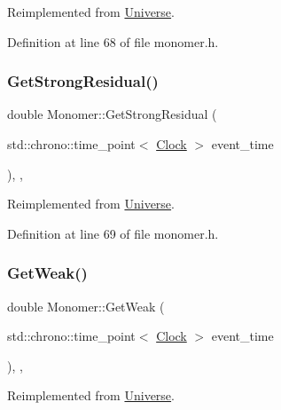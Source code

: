 Reimplemented from \hyperlink{class_universe_ab44daccba01ee7e3cf9b50bba83dd19e}{Universe}.



Definition at line 68 of file monomer.\+h.

\mbox{\label{class_monomer_a3b00168520f592098356f7cd3e663ad3}} 
\subsubsection{\texorpdfstring{Get\+Strong\+Residual()}{GetStrongResidual()}}
{\footnotesize\ttfamily double Monomer\+::\+Get\+Strong\+Residual (\begin{DoxyParamCaption}\item[{std\+::chrono\+::time\+\_\+point$<$ \hyperlink{universe_8h_a0ef8d951d1ca5ab3cfaf7ab4c7a6fd80}{Clock} $>$}]{event\+\_\+time }\end{DoxyParamCaption})\hspace{0.3cm}{\ttfamily [inline]}, {\ttfamily [final]}, {\ttfamily [virtual]}}



Reimplemented from \hyperlink{class_universe_af0f4b81950061e63c2855eb40957a5b1}{Universe}.



Definition at line 69 of file monomer.\+h.

\mbox{\label{class_monomer_ac2070d7e39cd0b2a00aa6023ffd51f55}} 
\subsubsection{\texorpdfstring{Get\+Weak()}{GetWeak()}}
{\footnotesize\ttfamily double Monomer\+::\+Get\+Weak (\begin{DoxyParamCaption}\item[{std\+::chrono\+::time\+\_\+point$<$ \hyperlink{universe_8h_a0ef8d951d1ca5ab3cfaf7ab4c7a6fd80}{Clock} $>$}]{event\+\_\+time }\end{DoxyParamCaption})\hspace{0.3cm}{\ttfamily [inline]}, {\ttfamily [final]}, {\ttfamily [virtual]}}



Reimplemented from \hyperlink{class_universe_a4476b7e0a3fc1764909f556257fd9ec7}{Universe}.



